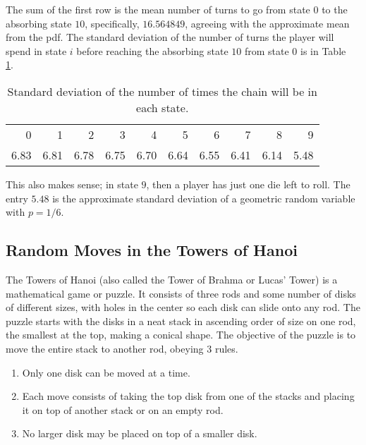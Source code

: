 \documentclass[12pt]{article}
\begin{document}
The sum of the first row is the mean number of turns to go from state \(
0 \) to the absorbing state \( 10 \), specifically, \( 16.564849 \),
agreeing with the approximate mean from the pdf.  The standard deviation
of the number of turns the player will spend in state \( i \) before
reaching the absorbing state \( 10 \) from state \( 0 \) is in Table~%
\ref{tab:games:tenzisd}.
\begin{table}
    \centering
    \begin{tabular}{rrrrrrrrrr}
        0    & 1    & 2    & 3    & 4    & 5    & 6    & 7    & 8    & 9    \\ 
        6.83 & 6.81 & 6.78 & 6.75 & 6.70 & 6.64 & 6.55 & 6.41 & 6.14 & 5.48
    \end{tabular}
    \caption{Standard deviation of the number of times the chain will be
    in each state.}%
    \label{tab:games:tenzisd}
\end{table}
This also makes sense; in state \( 9 \), then a player has just one die
left to roll.  The entry \( 5.48 \) is the approximate standard
deviation of a geometric random variable with \( p = 1/6 \).

\subsection*{Random Moves in the Towers of Hanoi}

The Towers of Hanoi (also called the Tower of Brahma or Lucas' Tower) is
a mathematical game or puzzle.  It consists of three rods and some
number of disks of different sizes, with holes in the center so each
disk can slide onto any rod.  The puzzle starts with the disks in a neat
stack in ascending order of size on one rod, the smallest at the top,
making a conical shape.  The objective of the puzzle is to move the
entire stack to another rod, obeying \( 3 \) rules.
\begin{enumerate}
    \item
        Only one disk can be moved at a time.
    \item
        Each move consists of taking the top disk from one of the stacks
        and placing it on top of another stack or on an empty rod.
    \item
        No larger disk may be placed on top of a smaller disk.
\end{enumerate}
\end{document}
